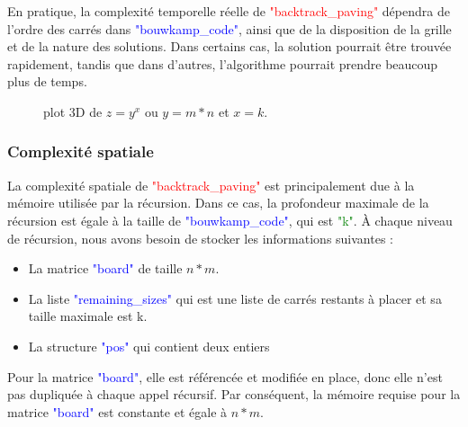 \documentclass{article}
\begin{document}
En pratique, la complexité temporelle réelle de \textcolor{red}{"backtrack\_paving"} dépendra de l'ordre des carrés dans \textcolor{blue}{"bouwkamp\_code"}, ainsi que de la disposition de la grille et de la nature des solutions. Dans certains cas, la solution pourrait être trouvée rapidement, tandis que dans d'autres, l'algorithme pourrait prendre beaucoup plus de temps.

\begin{figure}[htbp]
    \centering
    \caption{plot 3D de $z=y^x$ ou $y=m*n$ et $x=k$.}
    \label{fig4}
\end{figure}


\subsubsection{Complexité spatiale }

La complexité spatiale de \textcolor{red}{"backtrack\_paving"} est principalement due à la mémoire utilisée par la récursion. Dans ce cas, la profondeur maximale de la récursion est égale à la taille de \textcolor{blue}{"bouwkamp\_code"}, qui est \textcolor{green}{"k"}. À chaque niveau de récursion, nous avons besoin de stocker les informations suivantes :\newline

\begin{itemize}
  \item La matrice \textcolor{blue}{"board"} de taille $n * m$.
  \item La liste \textcolor{blue}{"remaining\_sizes"} qui est une liste de carrés restants à placer et sa taille maximale est k.
  \item La structure \textcolor{blue}{"pos"} qui contient deux entiers\newline
\end{itemize}

Pour la matrice \textcolor{blue}{"board"}, elle est référencée et modifiée en place, donc elle n'est pas dupliquée à chaque appel récursif. Par conséquent, la mémoire requise pour la matrice \textcolor{blue}{"board"} est constante et égale à $n * m$.\newline
\end{document}
